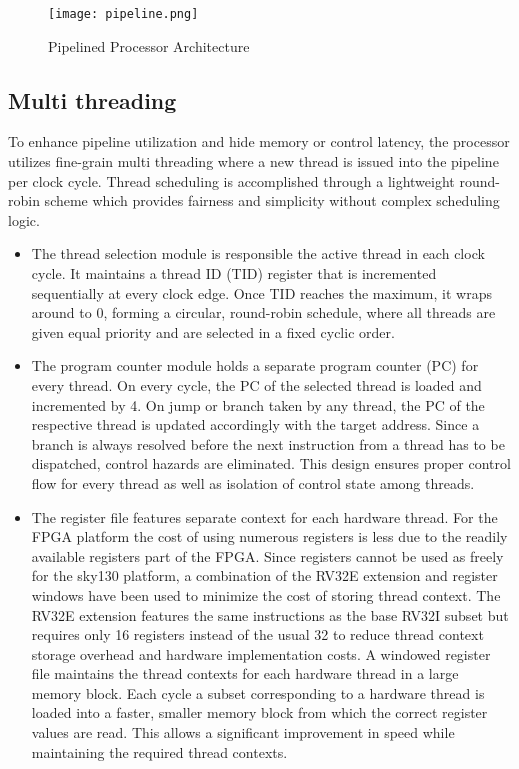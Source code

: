 \documentclass[conference]{IEEEtran}
\begin{document}
\begin{figure}[h!]
    \centering
    \texttt{[image: pipeline.png]}  %
    \caption{Pipelined Processor Architecture \cite{HANDH}}  %

        \label{fig:pipeline}  %
\end{figure}

\subsection{Multi threading}
To enhance pipeline utilization and hide memory or control latency, the processor utilizes fine-grain multi threading where a new thread is issued into the pipeline per clock cycle. Thread scheduling is accomplished through a lightweight round-robin scheme which provides fairness and simplicity without complex scheduling logic.
\begin{itemize}
    \item The thread selection module is responsible the active thread in each clock cycle. It maintains a thread ID (TID) register that is incremented sequentially at every clock edge. Once TID reaches the maximum, it wraps around to 0, forming a circular, round-robin schedule, where all threads are given equal priority and are selected in a fixed cyclic order.
\end{itemize}
\begin{itemize}
    \item The program counter module holds a separate program counter (PC) for every thread. On every cycle, the PC of the selected thread is loaded and incremented by 4. On jump or branch taken by any thread, the PC of the respective thread is updated accordingly with the target address. Since a branch is always resolved before the next instruction from a thread has to be dispatched, control hazards are eliminated.
    This design ensures proper control flow for every thread as well as isolation of control state among threads.
\end{itemize}
\begin{itemize}
    \item The register file features separate context for each hardware thread. For the FPGA platform the cost of using numerous registers is less due to the readily available registers part of the FPGA. Since registers cannot be used as freely for the sky130 platform, a combination of the RV32E extension and register windows have been used to minimize the cost of storing thread context. The RV32E extension features the same instructions as the base RV32I subset but requires only 16 registers instead of the usual 32 to reduce thread context storage overhead and hardware implementation costs. A windowed register file maintains the thread contexts for each hardware thread in a large memory block. Each cycle a subset corresponding to a hardware thread is loaded into a faster, smaller memory block from which the correct register values are read. This allows a significant improvement in speed while maintaining the required thread contexts.
\end{itemize}
\end{document}
